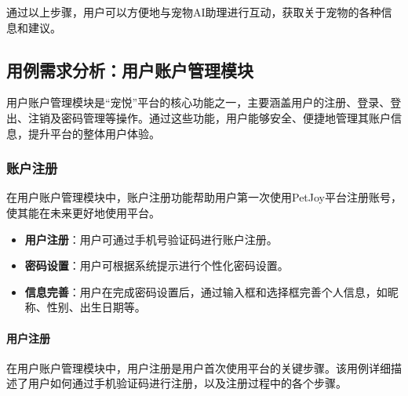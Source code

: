 \noindent 通过以上步骤，用户可以方便地与宠物AI助理进行互动，获取关于宠物的各种信息和建议。

\subsection{用例需求分析：用户账户管理模块}

用户账户管理模块是“宠悦”平台的核心功能之一，主要涵盖用户的注册、登录、登出、注销及密码管理等操作。通过这些功能，用户能够安全、便捷地管理其账户信息，提升平台的整体用户体验。

\subsubsection{账户注册}

在用户账户管理模块中，账户注册功能帮助用户第一次使用PetJoy平台注册账号，使其能在未来更好地使用平台。

\begin{itemize}
	\item \textbf{用户注册}：用户可通过手机号验证码进行账户注册。
	\item \textbf{密码设置}：用户可根据系统提示进行个性化密码设置。
	\item \textbf{信息完善}：用户在完成密码设置后，通过输入框和选择框完善个人信息，如昵称、性别、出生日期等。
\end{itemize}

\paragraph{用户注册}

在用户账户管理模块中，用户注册是用户首次使用平台的关键步骤。该用例详细描述了用户如何通过手机验证码进行注册，以及注册过程中的各个步骤。


